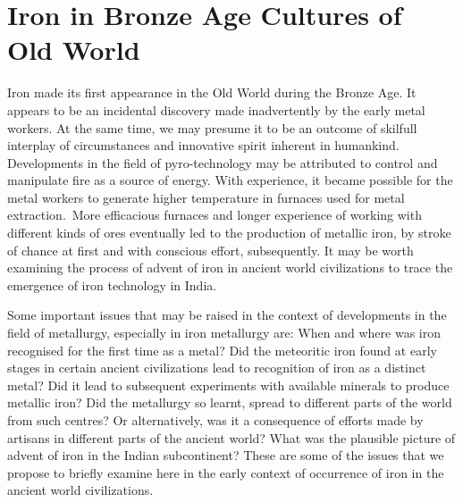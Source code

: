 
\vspace{-.5cm}

\chapter{Iron in Bronze Age Cultures of\\ Old World}\label{chapter2}


\vspace{-.3cm}


Iron made its first appearance in the Old World during the Bronze Age. It appears to be an incidental discovery made inadvertently by the early metal workers. At the same time, we may presume it to be an outcome of skilfull interplay of circumstances and innovative spirit inherent in humankind. Developments in the field of pyro-technology may be attributed to control and manipulate fire as a source of energy. With experience, it became possible for the metal workers to generate higher temperature in furnaces used for metal extraction.~More efficacious furnaces and longer experience of working with different kinds of ores eventually led to the production of metallic iron, by stroke of chance at first and with conscious effort, subsequently. It may be worth examining the process of advent of iron in ancient world civilizations to trace the emergence of iron technology in India. 

Some important issues that may be raised in the context of developments in the field of metallurgy, especially in iron metallurgy are: When and where was iron recognised for the first time as a metal? Did the meteoritic iron found at early stages in certain ancient civilizations lead to recognition of iron as a distinct metal? Did it lead to subsequent experiments with available minerals to produce metallic iron? Did the metallurgy so learnt, spread to different parts of the world from such centres? Or alternatively, was it a consequence of efforts made by artisans in different parts of the ancient world? What was the plausible picture of advent of iron in the Indian subcontinent? These are some of the issues that we propose to briefly examine here in the early context of occurrence of iron in the ancient world civilizations.

